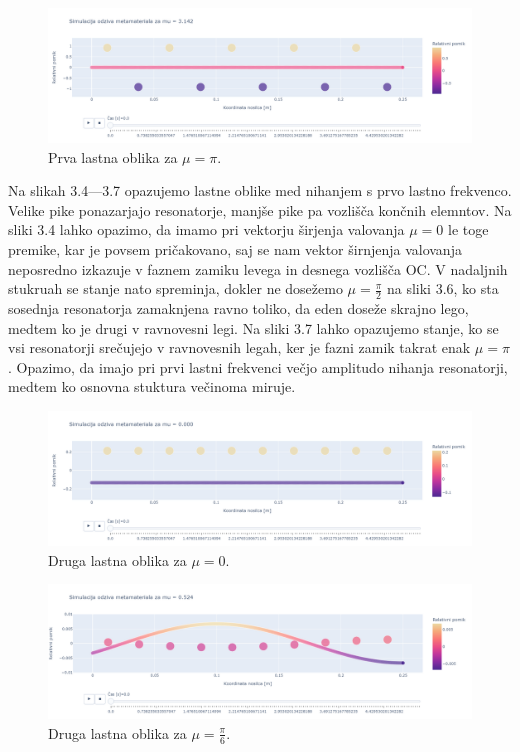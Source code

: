 \documentclass[12pt]{report}
\begin{document}
\begin{figure}[H]
  \centering
  \includegraphics[trim={0 4cm 0 3.5cm},clip, scale=0.3]{Images/Metamaterial_oblika_1_mu_3.142.png}
  \caption{Prva lastna oblika za $\mu = \pi$.}
\end{figure}
\noindent Na slikah 3.4---3.7 opazujemo lastne oblike med nihanjem s prvo lastno frekvenco. Velike pike ponazarjajo resonatorje, manjše pike pa vozlišča končnih elemntov.
Na sliki 3.4 lahko opazimo, da imamo pri vektorju širjenja valovanja $\mu = 0$ le toge premike, kar je povsem pričakovano, saj se nam vektor širnjenja valovanja neposredno izkazuje v faznem zamiku levega in desnega
vozlišča \ac{OC}. V nadaljnih stukruah se stanje nato spreminja, dokler ne dosežemo $\mu = \frac{\pi}{2}$ na sliki 3.6, ko sta sosednja resonatorja zamaknjena ravno toliko, da eden doseže skrajno lego, medtem ko je drugi v ravnovesni legi.
Na sliki 3.7 lahko opazujemo stanje, ko se vsi resonatorji srečujejo v ravnovesnih legah, ker je fazni zamik takrat enak $\mu = \pi$. Opazimo, da imajo pri prvi lastni frekvenci večjo amplitudo nihanja resonatorji, medtem ko osnovna stuktura večinoma miruje.
\begin{figure}[H]
  \centering
  \includegraphics[trim={0 4cm 0 3.5cm},clip, scale=0.3]{Images/Metamaterial_oblika_2_mu_0.000.png}
  \caption{Druga lastna oblika za $\mu = 0$.}
\end{figure}
\begin{figure}[H]
  \centering
  \includegraphics[trim={0 4cm 0 3.5cm},clip, scale=0.3]{Images/Metamaterial_oblika_2_mu_0.524.png}
  \caption{Druga lastna oblika za $\mu = \frac{\pi}{6}$.}
\end{figure}
\end{document}
